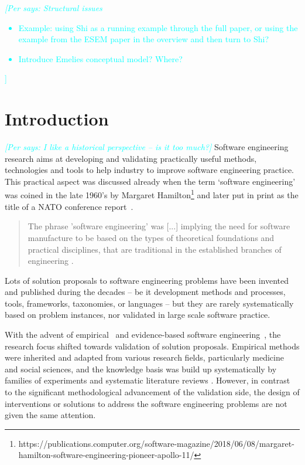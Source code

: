 \documentclass[graybox]{svmult}
\newcommand{\per}[1]{\textcolor{cyan}{{\it [Per says: #1]}}}
\newcommand{\per}[1]{}
\begin{document}
\per{Structural issues
\begin{itemize}
\item Example: using Shi as a running example through the full paper, or using the example from the ESEM paper in the overview and then turn to Shi?
\item Introduce Emelies conceptual model? Where?
\end{itemize}}
\section{Introduction}
\label{sec:intro}

\per{I like a historical perspective -- is it too much?}
Software engineering research aims at developing and validating practically useful methods, technologies and tools to help industry to improve software engineering practice. This practical aspect was discussed already when the term `software engineering' was coined in the late 1960's by Margaret Hamilton\footnote{https://publications.computer.org/software-magazine/2018/06/08/margaret-hamilton-software-engineering-pioneer-apollo-11/} and later put in print as the title of a NATO conference report~\cite{Nato1968}. 

\begin{quote}
{The phrase 'software engineering' was [...] implying the need for software manufacture to be based on the types of theoretical foundations and practical disciplines, that are traditional in the established branches of engineering} \cite[p13]{Nato1968}. 
\end{quote}

Lots of solution proposals to software engineering problems have been invented and published during the decades -- be it development methods and processes, tools, frameworks, taxonomies, or languages -- but they are rarely systematically based on problem instances, nor validated in large scale software practice.

With the advent of empirical~\cite{Basili86} and evidence-based software engineering~\cite{Kitchenham04}, the research focus shifted towards validation of solution proposals. Empirical methods were inherited and adapted from various research fields, particularly medicine and social sciences, and the knowledge basis was build up systematically by families of experiments \cite{Basili99} and systematic literature reviews \cite{Kitchenham15}. However, in contrast to the significant methodological advancement of the validation side, the design of interventions or solutions to address the software engineering problems are not given the same attention. 
\end{document}
